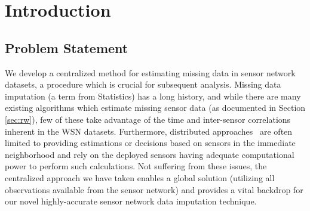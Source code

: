 \section{Introduction}

\subsection{Problem Statement }
We develop a centralized method for estimating missing data in sensor network datasets, a procedure which is crucial for subsequent analysis.
Missing data imputation (a term from Statistics) has a long history, and while there are many existing algorithms which estimate missing sensor data (as documented in Section \ref{sec:rw}), few of these take advantage of the time and inter-sensor correlations inherent in the WSN datasets.
Furthermore, distributed approaches~\cite{xiao2006space,nowak2003distributed} are often limited to providing estimations or decisions based on sensors in the immediate neighborhood and rely on the deployed sensors having adequate computational power to perform such calculations.
Not suffering from these issues, the centralized approach we have taken enables a global solution (utilizing all observations available from the sensor network) and provides a vital backdrop for our novel highly-accurate sensor network data imputation technique.


